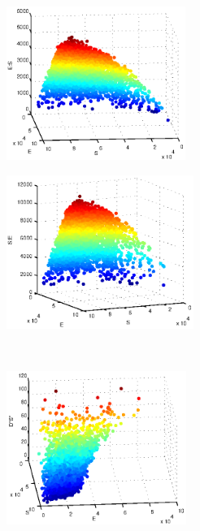 \begin{figure}[t]
\centering
\begin{subfigure}{0.45\textwidth}
\includegraphics[height=5cm]{rxn_manifold1}
\caption{}
\label{subfig:rxn_manifolds1}
\end{subfigure}
\begin{subfigure}{0.45\textwidth}
\includegraphics[height=5cm]{rxn_manifold2} 
\caption{}
\label{subfig:rxn_manifolds2}
\end{subfigure}\\
\begin{subfigure}{0.45\textwidth}
\includegraphics[height=5cm]{rxn_manifold3} 

\end{subfigure}
\end{figure}

